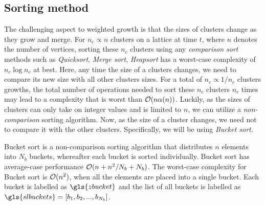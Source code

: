 \subsection{Sorting method}

The challenging aspect to weighted growth is that the sizes of clusters change as they grow and merge. For $n_c\propto n$ clusters on a lattice at time $t$, where $n$ denotes the number of vertices, sorting these $n_c$ clusters using any \emph{comparison sort} methods such as \emph{Quicksort}, \emph{Merge sort}, \emph{Heapsort} has a worst-case complexity of $n_c \log n_c$ at best. Here, any time the size of a clusters changes, we need to compare its new size with all other clusters sizes. For a total of $n_c \propto 1/n_c$ clusters growths, the total number of operations needed to sort these $n_c$ clusters $n_c$ times may lead to a complexity that is worst than $\mathcal{O}(n\alpha(n))$. Luckily, as the sizes of clusters can only take on integer values and is limited to $n$, we can utilize a \emph{non-comparison} sorting algorithm. Now, as the size of a cluster changes, we need not to compare it with the other clusters. Specifically, we will be using \emph{Bucket sort}. 
\begin{definition}\label{def:buckets}
  Bucket sort is a non-comparison sorting algorithm that distributes $n$ elements into $N_b$ buckets, whereafter each bucket is sorted individually. Bucket sort has average-case performance $\mathcal{O}(n + n^2/N_b + N_b)$. The worst-case complexity for Bucket sort is $\mathcal{O}(n^2)$, when all the elements are placed into a single bucket. Each bucket is labelled as $\gls{zbucket}$ and the list of all buckets is labelled as $\gls{slbuckets}=[b_1, b_2, ...,b_{N_b}]$. 
\end{definition}
